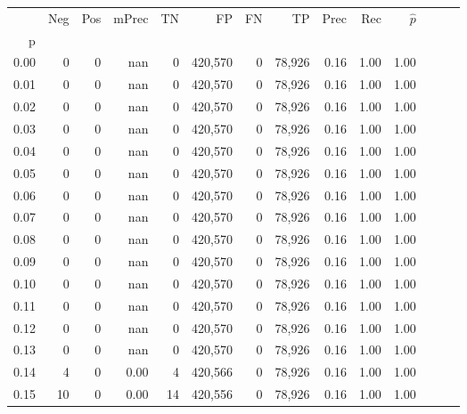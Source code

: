 \begin{tabular}{rrrrrrrrrrrrrr}
\toprule
{} &     Neg &    Pos & mPrec &       TN &       FP &      FN &      TP &  Prec &   Rec & $\hat{p}$ \\
p    &         &        &       &          &          &         &         &       &       &           \\
\midrule
0.00 &       0 &      0 &   nan &        0 &  420,570 &       0 &  78,926 &  0.16 &  1.00 &      1.00 \\
0.01 &       0 &      0 &   nan &        0 &  420,570 &       0 &  78,926 &  0.16 &  1.00 &      1.00 \\
0.02 &       0 &      0 &   nan &        0 &  420,570 &       0 &  78,926 &  0.16 &  1.00 &      1.00 \\
0.03 &       0 &      0 &   nan &        0 &  420,570 &       0 &  78,926 &  0.16 &  1.00 &      1.00 \\
0.04 &       0 &      0 &   nan &        0 &  420,570 &       0 &  78,926 &  0.16 &  1.00 &      1.00 \\
0.05 &       0 &      0 &   nan &        0 &  420,570 &       0 &  78,926 &  0.16 &  1.00 &      1.00 \\
0.06 &       0 &      0 &   nan &        0 &  420,570 &       0 &  78,926 &  0.16 &  1.00 &      1.00 \\
0.07 &       0 &      0 &   nan &        0 &  420,570 &       0 &  78,926 &  0.16 &  1.00 &      1.00 \\
0.08 &       0 &      0 &   nan &        0 &  420,570 &       0 &  78,926 &  0.16 &  1.00 &      1.00 \\
0.09 &       0 &      0 &   nan &        0 &  420,570 &       0 &  78,926 &  0.16 &  1.00 &      1.00 \\
0.10 &       0 &      0 &   nan &        0 &  420,570 &       0 &  78,926 &  0.16 &  1.00 &      1.00 \\
0.11 &       0 &      0 &   nan &        0 &  420,570 &       0 &  78,926 &  0.16 &  1.00 &      1.00 \\
0.12 &       0 &      0 &   nan &        0 &  420,570 &       0 &  78,926 &  0.16 &  1.00 &      1.00 \\
0.13 &       0 &      0 &   nan &        0 &  420,570 &       0 &  78,926 &  0.16 &  1.00 &      1.00 \\
0.14 &       4 &      0 &  0.00 &        4 &  420,566 &       0 &  78,926 &  0.16 &  1.00 &      1.00 \\
0.15 &      10 &      0 &  0.00 &       14 &  420,556 &       0 &  78,926 &  0.16 &  1.00 &      1.00 \\

\end{tabular}
